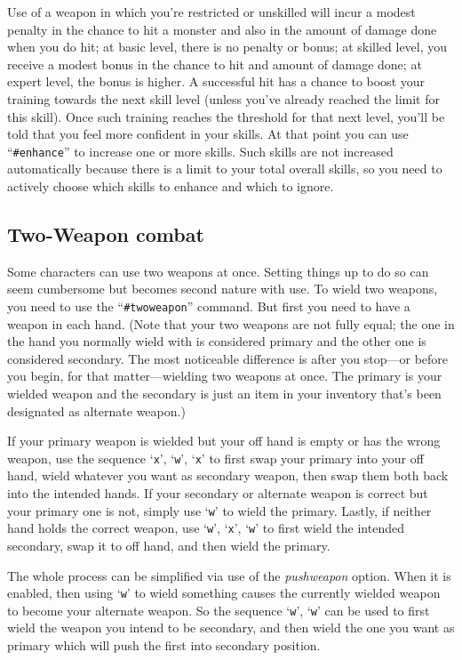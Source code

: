 \documentclass[titlepage]{article}
\begin{document}
Use of a weapon in which you're restricted or unskilled
will incur a modest penalty in the chance to hit a monster and also in
the amount of damage done when you do hit; at basic level, there is no
penalty or bonus; at skilled level, you receive a modest bonus in the
chance to hit and amount of damage done; at expert level, the bonus is
higher.  A successful hit has a chance to boost your training towards
the next skill level (unless you've already reached the limit for this
skill).  Once such training reaches the threshold for that next level,
you'll be told that you feel more confident in your skills.  At that
point you can use ``\texttt{\#enhance}'' to increase one or more skills.
Such skills
are not increased automatically because there is a limit to your total
overall skills, so you need to actively choose which skills to enhance
and which to ignore.

\subsection*{Two-Weapon combat}

Some characters can use two weapons at once.  Setting things up to
do so can seem cumbersome but becomes second nature with use.
To wield two weapons, you need to use the ``\texttt{\#twoweapon}'' command.
But first you need to have a weapon in each hand.
(Note that your two weapons are not fully equal; the one in the
hand you normally wield with is considered primary and the other
one is considered secondary.
The most noticeable difference is after you
stop---or before you begin, for that matter---wielding
two weapons at once.
The primary is your wielded weapon and the
secondary is just an item in your inventory that's been designated
as alternate weapon.)

If your primary weapon is wielded but your off hand is empty or has
the wrong weapon, use the sequence `\texttt{x}', `\texttt{w}', `\texttt{x}' to
first swap your
primary into your off hand, wield whatever you want as secondary
weapon, then swap them both back into the intended hands.
If your secondary or alternate weapon is correct but your primary
one is not, simply use `\texttt{w}' to wield the primary.
Lastly, if neither hand holds the correct weapon,
use `\texttt{w}', `\texttt{x}', `\texttt{w}'
to first wield the intended secondary, swap it to off hand, and then
wield the primary.

The whole process can be simplified via use of the
\textit{pushweapon}
option.  When it is enabled, then using `\texttt{w}' to wield something
causes the currently wielded weapon to become your alternate weapon.
So the sequence `\texttt{w}', `\texttt{w}' can be used to first wield the weapon you
intend to be secondary, and then wield the one you want as primary
which will push the first into secondary position.
\end{document}
